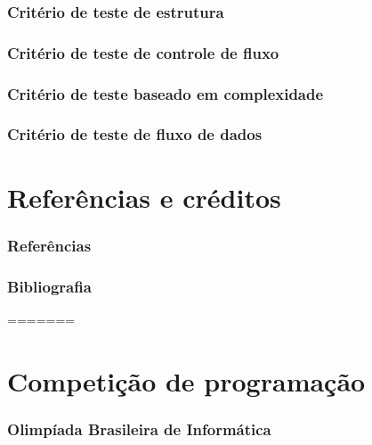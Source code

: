 \documentclass[utf8, usepdftitle=false, svgnames, color={table, fixpdftex, hyperref, fixinclude, xcdraw}, t, brazil]{beamer}
\begin{document}
 \section{Critério de teste de estrutura}
 
 
 \section{Critério de teste de controle de fluxo}
  
 
 \section{Critério de teste baseado em complexidade}
  

 \section{Critério de teste de fluxo de dados}
   
 
 \part{Referências e créditos}
 
 \section{Referências}
 
 
 \section{Bibliografia}
 
 
%  
=======
	\frontmatter{}
	

	\part{Competição de programação}

		\section[OBI]{Olimpíada Brasileira de Informática}
		
\end{document}

